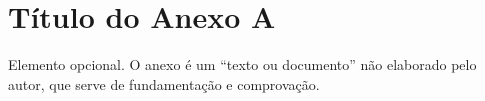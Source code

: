 \chapter{Título do Anexo A} \label{anexo:a}
Elemento opcional. O anexo é um “texto ou documento” não elaborado pelo autor, que serve de fundamentação e comprovação.

